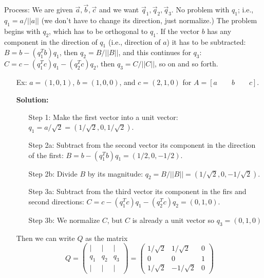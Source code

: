 \documentclass[reqno]{amsart}
\theoremstyle{definition}
\begin{document}
Process:  We are given $\vec{a}, \vec{b}, \vec{c}$ and we want $\vec{q}_1, \vec{q}_2, \vec{q}_3$.
No problem with $q_1$; i.e., $q_1 = a/||a||$ {\color{red}(we don't have to change its direction, just
normalize.)}  The problem begins with $q_2$, which has to be orthogonal to $q_1$.  If the vector $b$
has any component in the direction of $q_1$ {\color{red}(i.e., direction of $a$)} it has to be
subtracted:  $B = b - (q_1^Tb)q_1$, then $q_2 = B/||B||$, and this continues for $q_3$:
$C = c - (q_1^Tc)q_1 - (q_2^Tc)q_2$, then $q_3 = C/||C||$, so on and so forth.

\begin{itemize}

\item[Ex:  ]  $a = (1, 0, 1)$, $b = (1, 0, 0)$, and $c = (2, 1, 0)$ for $A = [a\qquad b\qquad c]$.

\textbf{Solution:  }

\begin{enumerate}

\item[Step 1:  ]  Make the first vector into a unit vector:  $\boxed{q_1 = a/\sqrt{2} = (1/\sqrt{2}, 0, 1/\sqrt{2})}$.

\item[Step 2a:  ]  Subtract from the second vector its component in the direction of the first:
$\boxed{B = b - (q_1^Tb)q_1 = (1/2, 0, -1/2)}$.

\item[Step 2b:  ]  Divide $B$ by its magnitude:  $\boxed{q_2 = B/||B|| = (1/\sqrt{2}, 0, -1/\sqrt{2})}$.

\item[Step 3a:  ]  Subtract from the third vector its component in the firs and second directions:
$\boxed{C = c - (q_1^Tc)q_1 - (q_2^Tc)q_2 = (0, 1, 0)}$.

\item[Step 3b:  ]  We normalize $C$, but $C$ is already a unit vector so $\boxed{q_3 = (0, 1, 0)}$

\end{enumerate}

Then we can write $Q$ as the matrix
%
\begin{equation*}
Q = \begin{pmatrix}
| & | & |\\
q_1 & q_2 & q_3\\
| & | & |
\end{pmatrix} = \begin{pmatrix}
1/\sqrt{2} & 1/\sqrt{2} & 0\\
0 & 0 & 1\\
1/\sqrt{2} & -1/\sqrt{2} & 0
\end{pmatrix}
\end{equation*}

\end{itemize}
\end{document}
